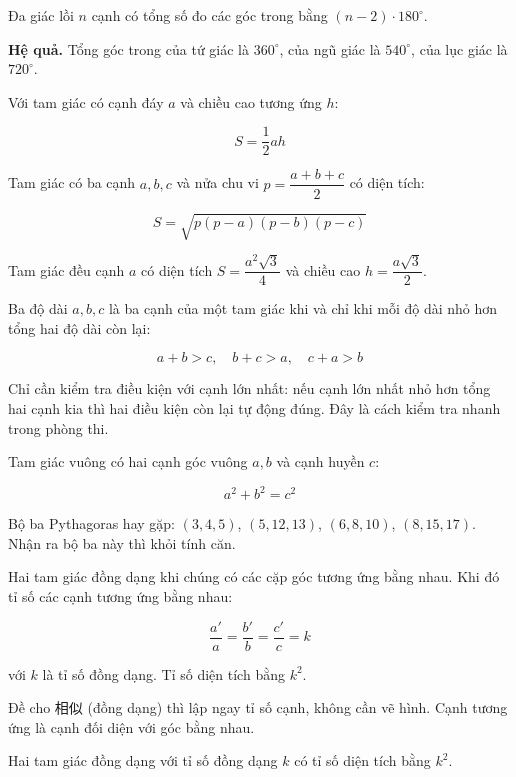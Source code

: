 \documentclass[11pt, a4paper]{article}
\begin{document}
\begin{dinhly}
Đa giác lồi $n$ cạnh có tổng số đo các góc trong bằng $(n-2) \cdot 180^\circ$.

\textbf{Hệ quả.} Tổng góc trong của tứ giác là $360^\circ$, của ngũ giác là $540^\circ$, của lục giác là $720^\circ$.
\end{dinhly}
\begin{dinhly}
Với tam giác có cạnh đáy $a$ và chiều cao tương ứng $h$:

$$S = \frac{1}{2}ah$$
\end{dinhly}
\begin{dinhly}
Tam giác có ba cạnh $a, b, c$ và nửa chu vi $p = \dfrac{a+b+c}{2}$ có diện tích:

$$S = \sqrt{p(p-a)(p-b)(p-c)}$$
\end{dinhly}
\begin{dinhly}
Tam giác đều cạnh $a$ có diện tích $S = \dfrac{a^2\sqrt{3}}{4}$ và chiều cao $h = \dfrac{a\sqrt{3}}{2}$.
\end{dinhly}
\begin{dinhly}
Ba độ dài $a, b, c$ là ba cạnh của một tam giác khi và chỉ khi mỗi độ dài nhỏ hơn tổng hai độ dài còn lại:

$$a + b > c, \quad b + c > a, \quad c + a > b$$

 Chỉ cần kiểm tra điều kiện với cạnh lớn nhất: nếu cạnh lớn nhất nhỏ hơn tổng hai cạnh kia thì hai điều kiện còn lại tự động đúng. Đây là cách kiểm tra nhanh trong phòng thi.
\end{dinhly}
\begin{dinhly}
Tam giác vuông có hai cạnh góc vuông $a, b$ và cạnh huyền $c$:

$$a^2 + b^2 = c^2$$

 Bộ ba Pythagoras hay gặp: $(3, 4, 5)$, $(5, 12, 13)$, $(6, 8, 10)$, $(8, 15, 17)$. Nhận ra bộ ba này thì khỏi tính căn.
\end{dinhly}
\begin{dinhly}
Hai tam giác đồng dạng khi chúng có các cặp góc tương ứng bằng nhau. Khi đó tỉ số các cạnh tương ứng bằng nhau:

$$\frac{a'}{a} = \frac{b'}{b} = \frac{c'}{c} = k$$

với $k$ là tỉ số đồng dạng. Tỉ số diện tích bằng $k^2$.

 Đề cho 相似 (đồng dạng) thì lập ngay tỉ số cạnh, không cần vẽ hình. Cạnh tương ứng là cạnh đối diện với góc bằng nhau.
\end{dinhly}
\begin{dinhly}
Hai tam giác đồng dạng với tỉ số đồng dạng $k$ có tỉ số diện tích bằng $k^2$.
\end{dinhly}
\end{document}
